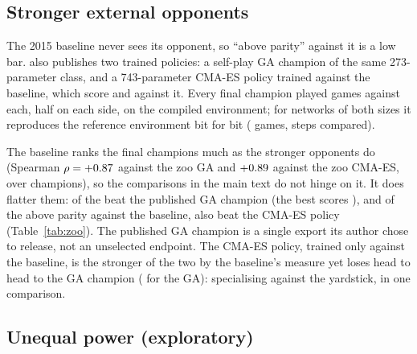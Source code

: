 \documentclass[11pt]{article}
\begin{document}
\begin{table}[!htbp]
\centering\small
\caption{Within-run tournament at 5,000-game spacing, control runs.}
\label{tab:fine}
\resizebox{\linewidth}{!}{}
\end{table}

\FloatBarrier
\subsection{Stronger external opponents}
\label{app:zoo}

The 2015 baseline never sees its opponent, so ``above parity'' against it is a
low bar. \citet{ha2020slimevolleygym} also publishes two trained policies: a
self-play GA champion of the same 273-parameter class, and a 743-parameter
CMA-ES policy trained against the baseline, which score \nZooGaVsBase{} and
\nZooCmaVsBase{} against it. Every final champion played \nZooGames{} games
against each, half on each side, on the compiled environment; for networks of
both sizes it reproduces the reference environment bit for bit
(\nZooValidGames{} games, \nZooValidSteps{} steps compared).

The baseline ranks the final champions much as the stronger opponents do
(Spearman $\rho=+0.87$ against the zoo GA and $+0.89$ against
the zoo CMA-ES, over \nZooN{} champions), so the comparisons in the main text do
not hinge on it. It does flatter them: \nZooBeatGa{} of the \nZooN{} beat the
published GA champion (the best scores \nZooBestVsGa), and of the
\nZooAboveBase{} above parity against the baseline, \nZooAboveBeatCma{} also beat
the CMA-ES policy (Table~\ref{tab:zoo}). The published GA champion is a single
export its author chose to release, not an unselected endpoint. The CMA-ES
policy, trained only against the baseline, is the stronger of the two by the
baseline's measure yet loses head to head to the GA champion (\nZooGaVsCma{} for
the GA): specialising against the yardstick, in one comparison.

\begin{table}[!htbp]
\centering\small
\caption{Final champions against the 2015 baseline (held out) and the two
slimevolleygym zoo policies, points per episode, by condition.}
\label{tab:zoo}
\resizebox{\linewidth}{!}{}
\end{table}

\FloatBarrier
\subsection{Unequal power (exploratory)}
\label{app:asym}
\end{document}
